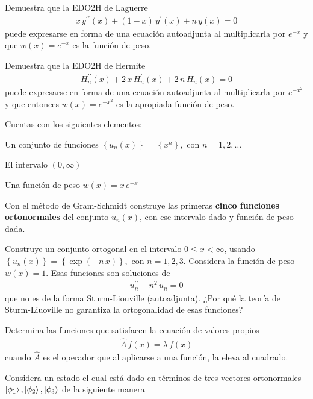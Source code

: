 \begin{milista}
\begin{milista}
\end{milista}
\item Demuestra que la EDO2H de Laguerre
\begin{align*}
x \, y^{\prime \prime}(x) + (1- x) \, y^{\prime} (x) + n \, y (x) = 0
\end{align*}
puede expresarse en forma de una ecuación autoadjunta al multiplicarla por $e^{-x}$ y que $w(x) = e^{-x}$ es la función de peso.
\item Demuestra que la EDO2H de Hermite
\begin{align*}
H_{n}^{\prime \prime} (x) + 2 \, x \, H_{n}^{\prime} (x) + 2 \, n \, H_{n} (x) = 0
\end{align*}
puede expresarse en forma de una ecuación autoadjunta al multiplicarla por $e^{-x^{2}}$ y que entonces $w(x) = e^{-x^{2}}$ es la apropiada función de peso.
\item Cuentas con los siguientes elementos:
\begin{milista}
\item Un conjunto de funciones $\left\{ u_{n} (x) \right\} = \left\{ x^{n} \right\}, \mbox{ con } n = 1, 2, \ldots$
\item El intervalo $(0, \infty)$
\item Una función de peso $w(x) = x \, e^{-x}$
\end{milista}
Con el método de Gram-Schmidt construye las primeras \textbf{cinco funciones ortonormales} del conjunto $u_{n}(x)$, con ese intervalo dado y función de peso dada.
\item Construye un conjunto ortogonal en el intervalo $0 \leq x < \infty$, usando $\left\{ u_{n}(x) \right\} = \left\{ \exp(-n \, x) \right\}, \mbox{ con } n = 1, 2, 3$. Considera la función de peso $w(x) = 1$. Esas funciones son soluciones de
\begin{align*}
u_{n}^{\prime \prime} - n^{2} \, u_{n} = 0
\end{align*}
que no es de la forma Sturm-Liouville (autoadjunta). ¿Por qué la teoría de Sturm-Liuoville no garantiza la ortogonalidad de esas funciones?
\item Determina las funciones que satisfacen la ecuación de valores propios
\begin{align*}
\hat{A} \, f(x) = \lambda \, f(x)
\end{align*}
cuando $\hat{A}$ es el operador que al aplicarse a una función, la eleva al cuadrado.
\item Considera un estado el cual está dado en términos de tres vectores ortonormales $\ket{\phi_{1}}, \ket{\phi_{2}}, \ket{\phi_{3}}$ de la siguiente manera

\end{milista}
